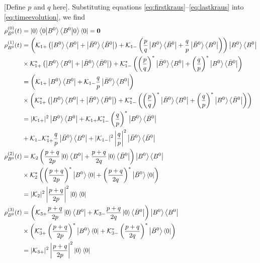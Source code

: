 [Define $p$ and $q$ here]. Substituting equations \ref{eq:firstkraus}--\ref{eq:lastkraus} into \ref{eq:timeevolution}, we find
\begin{align}
\label{eq:firstterm}
\rho_{B^0}^{(0)}(t) &= \ket{0}\braket{0}{B^0}\braket{B^0}{0}\bra{0} = \mathbf{0} \\
\rho_{B^0}^{(1)}(t) &= \left(\mathcal{K}_{1+}\left(\ket{B^0}\bra{B^0} + \ket{\bar{B}^0}\bra{\bar{B}^0}\right) +\mathcal{K}_{1-}\left(\frac{p}{q}\ket{B^0}\bra{\bar{B}^0}+\frac{q}{p} \ket{\bar{B}^0}\bra{B^0}\right)\right)\ket{B^0}\bra{B^0}\nonumber\\
& \times \mathcal{K}^*_{1+}\left(\ket{B^0}\bra{B^0} + \ket{\bar{B}^0}\bra{\bar{B}^0}\right) +\mathcal{K}^*_{1-}\left(\left(\frac{p}{q}\right)^*\ket{\bar{B}^0}\bra{B^0}+\left(\frac{q}{p}\right)^* \ket{B^0}\bra{\bar{B}^0}\right) \nonumber\\
&= \left(\mathcal{K}_{1+}\ket{B^0}\bra{B^0}+\mathcal{K}_{1-}\frac{q}{p}\ket{\bar{B}^0}\bra{B^0}\right)\nonumber \\
& \times \left(\mathcal{K}_{1+}^*\left(\ket{B^0}\bra{B^0}+\ket{\bar{B}^0}\bra{\bar{B}^0}\right)+\mathcal{K}_{1-}^*\left(\left(\frac{p}{q}\right)^*\ket{\bar{B}^0}\bra{B^0}+\left(\frac{q}{p}\right)^*\ket{B^0}\bra{\bar{B}^0}\right)\right)\nonumber\\
&=|\mathcal{K}_{1+}|^2\ket{B^0}\bra{B^0}+\mathcal{K}_{1+}\mathcal{K}_{1-}^*\left(\frac{q}{p}\right)^*\ket{B^0}\bra{\bar{B}^0}\nonumber\\
&+\mathcal{K}_{1-}\mathcal{K}_{1+}^*\frac{q}{p}\ket{\bar{B}^0}\bra{B^0}+|\mathcal{K}_{1-}|^2\left|\frac{q}{p}\right|^2\ket{\bar{B}^0}\bra{\bar{B}^0}\\
\rho_{B^0}^{(2)}(t) &= \mathcal{K}_2\left(\frac{p+q}{2p}\ket{0}\bra{B^0}+\frac{p+q}{2q}\ket{0}\bra{\bar{B}^0}\right)\ket{B^0}\bra{B^0}\nonumber \\
&\times \mathcal{K}_2^*\left(\left(\frac{p+q}{2p}\right)^*\ket{B^0}\bra{0}+\left(\frac{p+q}{2q}\right)^*\ket{\bar{B}^0}\bra{0}\right) \nonumber \\
&= |\mathcal{K}_2|^2\left|\frac{p+q}{2p}\right|^2\ket{0}\bra{0} \\
\rho_{B^0}^{(3)}(t) &= \left(\mathcal{K}_{3+}\frac{p+q}{2p}\ket{0}\bra{B^0}+\mathcal{K}_{3-}\frac{p+q}{2q}\ket{0}\bra{\bar{B}^0}\right)\ket{B^0}\bra{B^0}\nonumber \\
&\times \left(\mathcal{K}_{3+}^*\left(\frac{p+q}{2p}\right)^*\ket{B^0}\bra{0}+\mathcal{K}_{3-}^*\left(\frac{p+q}{2q}\right)^*\ket{\bar{B}^0}\bra{0}\right) \nonumber \\
&= |\mathcal{K}_{3+}|^2\left|\frac{p+q}{2p}\right|^2\ket{0}\bra{0} \\

\end{align}
